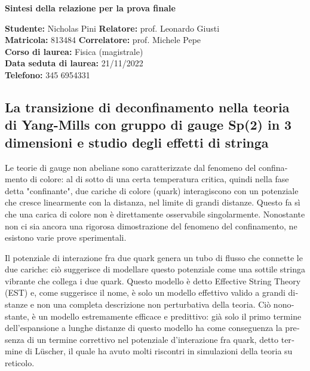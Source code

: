 \documentclass[reqno,11pt]{article}
\numberwithin{equation}{section}
\begin{document}
\begin{otherlanguage}{italian}

\pagestyle{empty}
    \begin{center}
        \textbf{\huge{Sintesi della relazione per la prova finale}} 
    \end{center}
    \medskip
    \textbf{Studente:} Nicholas Pini \hfill \textbf{Relatore:} prof. Leonardo Giusti \\
    \textbf{Matricola:} 813484       \hfill \textbf{Correlatore:} prof. Michele Pepe \\
    \textbf{Corso di laurea:} Fisica (magistrale) \\
	\textbf{Data seduta di laurea:} 21/11/2022 \\
    \textbf{Telefono:} 345 6954331

\subsection*{La transizione di deconfinamento nella teoria di Yang-Mills con gruppo di gauge Sp(2) in 3 dimensioni e studio degli effetti di stringa}

Le teorie di gauge non abeliane sono caratterizzate dal fenomeno del confinamento di colore: al di sotto di una certa
temperatura critica, quindi nella fase detta "confinante", due cariche di colore (quark) interagiscono con un potenziale che
cresce linearmente con la distanza, nel limite di grandi distanze. Questo fa sì che una carica di colore non è direttamente
osservabile singolarmente. Nonostante non ci sia ancora una rigorosa dimostrazione del fenomeno del confinamento, ne esistono
varie prove sperimentali. 

Il potenziale di interazione fra due quark genera un tubo di flusso che connette le due cariche: ciò
suggerisce di modellare questo potenziale come una sottile stringa vibrante che collega i due quark. Questo modello
è detto Effective String Theory (EST) e, come suggerisce il nome, è solo un modello effettivo valido a grandi distanze e
non una completa descrizione non perturbativa della teoria. Ciò nonostante, è un modello estremamente efficace e predittivo: 
già solo il primo termine dell'espansione a lunghe distanze di questo modello ha come conseguenza la presenza di un termine
correttivo nel potenziale d'interazione fra quark, detto termine di L{\"u}scher, il quale ha avuto molti riscontri 
in simulazioni della teoria su reticolo. 


\end{otherlanguage}
\end{document}
